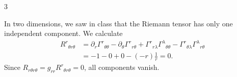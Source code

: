 \documentclass[11pt]{article}
\begin{document}
\begin{problem}{3}
\begin{enumerate}[label=(\alph*)]
\begin{answer}
            In two dimensions, we saw in class that the Riemann tensor has only one independent component. We calculate
            \begin{equation}
              \label{eq:13}
              \begin{aligned}
                R^r{}_{\theta r\theta}
                &=\partial_r\Gamma^r{}_{\theta\theta}
                -\partial_\theta\Gamma^r{}_{r\theta}
                +\Gamma^r{}_{r\lambda}\Gamma^\lambda{}_{\theta\theta}
                -\Gamma^r{}_{\theta\lambda}\Gamma^\lambda{}_{r\theta}\\
                &=-1-0+0-(-r)\frac1r=0.
              \end{aligned}
            \end{equation}
            Since \(R_{r\theta r\theta}=g_{rr}R^r{}_{\theta r\theta}=0\), all components vanish.
          \end{answer}
	\end{enumerate}
\end{problem}
\end{document}
